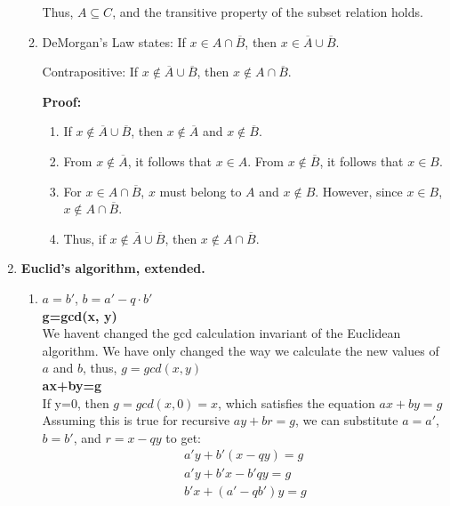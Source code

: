 \documentclass{article}
\begin{document}
\begin{enumerate}
\begin{enumerate}
        Thus, $A \subseteq C$, and the transitive property of the subset relation holds.
        


        \item DeMorgan’s Law states:  If $x \in A \cap \overline{B}$, then $x \in \overline{A} \cup \overline{B}$.
    
        Contrapositive:  If $x \notin \overline{A} \cup \overline{B}$, then $x \notin A \cap \overline{B}$.
    
        \textbf{Proof:}
        \begin{enumerate}
            \item If $x \notin \overline{A} \cup \overline{B}$, then $x \notin \overline{A}$ and $x \notin \overline{B}$.
            \item From $x \notin \overline{A}$, it follows that $x \in A$.  
            From $x \notin \overline{B}$, it follows that $x \in B$.
            \item For $x \in A \cap \overline{B}$, $x$ must belong to $A$ and $x \notin B$. However, since $x \in B$, $x \notin A \cap \overline{B}$.
            \item Thus, if $x \notin \overline{A} \cup \overline{B}$, then $x \notin A \cap \overline{B}$.
        \end{enumerate}
    \end{enumerate}



    \item \textbf{Euclid’s algorithm, extended.}
    \begin{enumerate}
        \item $a = b'$, $b = a' - q \cdot b'$ \\
        \textbf{g=gcd(x, y)} \\
        We havent changed the gcd calculation invariant of the Euclidean algorithm. We have only changed the way we calculate the new values of $a$ and $b$, thus, $g=gcd(x, y)$ \\
        \textbf{ax+by=g} \\
        If y=0, then $g=gcd(x, 0)=x$, which satisfies the equation $ax+by=g$ \\
        Assuming this is true for recursive $ay+br=g$, we can substitute $a = a'$, $b = b'$, and $r = x - qy$ to get:
        \begin{align*}
            a' y + b' (x - qy) = g \\
            a' y + b' x - b' qy = g \\
            b' x + (a' - q b') y = g \\
        \end{align*}


\end{enumerate}
\end{enumerate}
\end{document}
